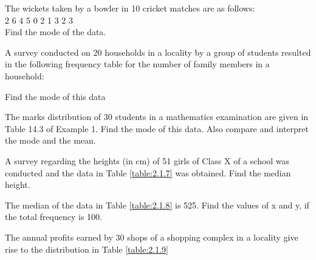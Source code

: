 \item The wickets taken by a bowler in 10 cricket matches are as follows:\\
2 6 4 5 0 2 1 3 2 3\\
Find the mode of the data.
\item A survey conducted on 20 households in a locality by a group of students
resulted in the following frequency table for the number of family members in a
household:
\begin{table}[!ht]
\centering
{}
\caption{}
\label{table:2.1.5}
\end{table}
Find the mode of this data
\item The marks distribution of 30 students in a mathematics examination are
given in Table 14.3 of Example 1. Find the mode of this data. Also compare and
interpret the mode and the mean.\\
\item A survey regarding the heights (in cm) of 51 girls of Class X of a school
was conducted and the  data in Table \ref{table:2.1.7}
was obtained.  Find the median height.

\begin{table}[!hb]
\centering

\caption{}
\label{table:2.1.7}
\end{table}
\item The median of the  data in Table \ref{table:2.1.8}
is 525. Find the values of x and y, if the
total frequency is 100.
\begin{table}
\centering
{}
\caption{}
\label{table:2.1.8}
\end{table}
\item The annual profits earned by 30 shops of a shopping complex in a locality give rise to  the  distribution in Table \ref{table:2.1.9}

